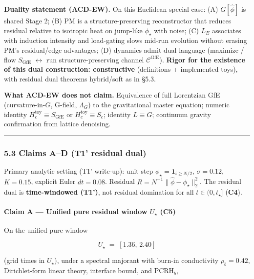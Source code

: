 \documentclass[
  11pt,
]{article}
\begin{document}
\textbf{Duality statement (ACD-EW).} On this Euclidean special case: (A) \(G[\hat\phi]\) is shared Stage 2; (B) PM is a structure-preserving reconstructor that reduces residual relative to isotropic heat on jump-like \(\phi_\star\) with noise; (C) \(L_E\) associates with induction intensity and load-gating slows mid-run evolution without erasing PM's residual/edge advantages; (D) dynamics admit dual language (maximize / flow \(S_{\mathrm{GfE}}\) \(\leftrightarrow\) run structure-preserving channel \(\mathcal{C}^{\mathrm{GfE}}\)). \textbf{Rigor for the existence of this dual construction: constructive} (definitions + implemented toys), with residual dual theorems hybrid/soft as in \S5.3.

\textbf{What ACD-EW does not claim.} Equivalence of full Lorentzian GfE (curvature-in-\(G\), G-field, \(\Lambda_G\)) to the gravitational master equation; numeric identity \(H_c^{\mathrm{toy}}\equiv S_{\mathrm{GfE}}\) or \(H_c^{\mathrm{toy}}\equiv S_c\); identity \(L\equiv G\); continuum gravity confirmation from lattice denoising.

\begin{center}\rule{0.5\linewidth}{0.5pt}\end{center}

\subsubsection{5.3 Claims A--D (T1' residual dual)}\label{claims-ad-t1-residual-dual}

Primary analytic setting (T1' write-up): unit step \(\phi_\star=\mathbf{1}_{i\ge N/2}\), \(\sigma=0.12\), \(K=0.15\), explicit Euler \(dt=0.08\). Residual \(R=N^{-1}\|\hat\phi-\phi_\star\|_2^2\). The residual dual is \textbf{time-windowed (T1')}, not residual domination for all \(t\in(0,t_\star]\) (\textbf{C4}).

\paragraph{\texorpdfstring{Claim A --- Unified pure residual window \(U_\star\) (\textbf{C5})}{Claim A --- Unified pure residual window U\_\textbackslash star (C5)}}\label{claim-a-unified-pure-residual-window-u_star-c5}

On the unified pure window

\[
U_\star \;=\; [1.36,\,2.40]
\]

(grid times in \(U_\star\)), under a spectral majorant with burn-in conductivity \(\rho_b=0.42\), Dirichlet-form linear theory, interface bound, and PCRH\(_b\),
\end{document}
